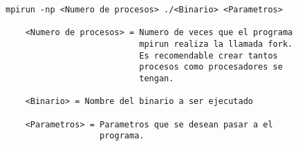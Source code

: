 \begin{lstlisting}[frame=single]
mpirun -np <Numero de procesos> ./<Binario> <Parametros>

    <Numero de procesos> = Numero de veces que el programa
                           mpirun realiza la llamada fork.
                           Es recomendable crear tantos
                           procesos como procesadores se
                           tengan.

    <Binario> = Nombre del binario a ser ejecutado

    <Parametros> = Parametros que se desean pasar a el
                   programa.

\end{lstlisting}

